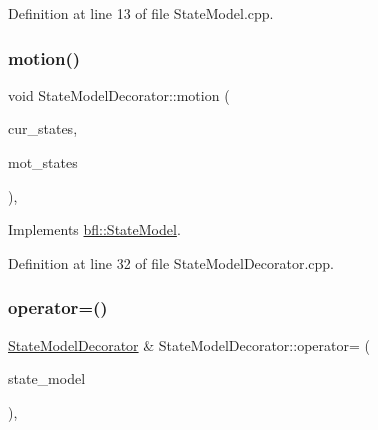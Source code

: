 Definition at line 13 of file State\+Model.\+cpp.

\mbox{\label{classbfl_1_1StateModelDecorator_af0ffeccf4bfcf8ddb36f3e6704fae7d2}} 
\subsubsection{\texorpdfstring{motion()}{motion()}}
{\footnotesize\ttfamily void State\+Model\+Decorator\+::motion (\begin{DoxyParamCaption}\item[{const Eigen\+::\+Ref$<$ const Eigen\+::\+Matrix\+Xd $>$ \&}]{cur\+\_\+states,  }\item[{Eigen\+::\+Ref$<$ Eigen\+::\+Matrix\+Xd $>$}]{mot\+\_\+states }\end{DoxyParamCaption})\hspace{0.3cm}{\ttfamily [override]}, {\ttfamily [virtual]}}



Implements \mbox{\hyperlink{classbfl_1_1StateModel_a34037bc30bc07667b76b5a719a65ab82}{bfl\+::\+State\+Model}}.



Definition at line 32 of file State\+Model\+Decorator.\+cpp.

\mbox{\label{classbfl_1_1StateModelDecorator_a5f7ab9c56ebbf7f653014933d688339b}} 
\subsubsection{\texorpdfstring{operator=()}{operator=()}}
{\footnotesize\ttfamily \mbox{\hyperlink{classbfl_1_1StateModelDecorator}{State\+Model\+Decorator}} \& State\+Model\+Decorator\+::operator= (\begin{DoxyParamCaption}\item[{\mbox{\hyperlink{classbfl_1_1StateModelDecorator}{State\+Model\+Decorator}} \&\&}]{state\+\_\+model }\end{DoxyParamCaption})\hspace{0.3cm}{\ttfamily [protected]}, {\ttfamily [noexcept]}}



